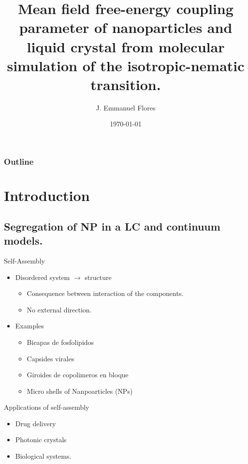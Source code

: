 \documentclass{beamer}
\title[Coupling constant between NP and LC]{Mean field free-energy coupling parameter of nanoparticles and liquid crystal from molecular simulation of the isotropic-nematic transition.}
\author[]{J. Emmanuel Flores \inst{1}}
\institute[Journal Club, Spring 2024]{\inst{1} Tufts University, Medford, MA}
\date{\today}
\begin{document}
\maketitle

\begin{frame}
    \frametitle{Outline}
      \tableofcontents
\end{frame}

\section{Introduction}
\subsection{Segregation of NP in a LC and continuum models.}

\begin{frame}{Self-Assembly}
    \begin{itemize}
        \item Disordered system $\rightarrow$ structure
        \begin{itemize}
            \item Consequence between interaction of the components.
            \item No external direction.
        \end{itemize}
        \item Examples
        \begin{itemize}
            \item Bicapas de fosfolipidos
            \item Capsides virales
            \item Giroides de copolimeros en bloque
            \item Micro shells of Nanpoarticles (NPs)
        \end{itemize}
    \end{itemize}
\end{frame}

\begin{frame}{Applications of self-assembly}
    \begin{itemize}
        \item Drug delivery
        \item Photonic crystals
        \item Biological systems.
    \end{itemize}
\end{frame}
\end{document}
